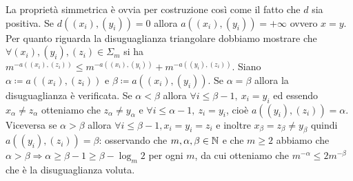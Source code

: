 La proprietà simmetrica è ovvia per costruzione così come il fatto che $ d $ sia positiva. Se $ d((x_i), (y_i)) = 0 $ allora $ a((x_i), (y_i)) = +\infty $ ovvero $ x = y $. Per quanto riguarda la disuguaglianza triangolare dobbiamo mostrare che $ \forall (x_i), (y_i), (z_i) \in \Sigma_m $ si ha $ m^{-a((x_i),(z_i))} \leq m^{-a((x_i), (y_i))} + m^{-a((y_i), (z_i))} $. Siano $ \alpha \coloneqq a((x_i), (z_i)) $ e $ \beta \coloneqq a((x_i), (y_i)) $. Se $ \alpha = \beta $ allora la disuguaglianza è verificata. Se $ \alpha < \beta $ allora $ \forall i \leq \beta-1, \ x_i = y_i $ ed essendo $ x_\alpha \neq z_\alpha $ otteniamo che $ z_\alpha \neq y_\alpha $ e $ \forall i \leq \alpha-1, \ z_i = y_i $, cioè $ a((y_i), (z_i)) = \alpha $. Viceversa se $ \alpha > \beta $ allora $ \forall i \leq \beta-1, x_i=y_i=z_i $ e inoltre $ x_\beta=z_\beta \neq y_\beta $ quindi $ a((y_i), (z_i)) = \beta $: osservando che $ m, \alpha, \beta \in \mathbb{N} $ e che $ m \geq 2 $ abbiamo che $ \alpha > \beta \Rightarrow \alpha \geq \beta - 1 \geq \beta - \log_m 2 $ per ogni $ m $, da cui otteniamo che $ m^{-\alpha} \leq 2m^{-\beta} $ che è la disuguaglianza voluta. \\

